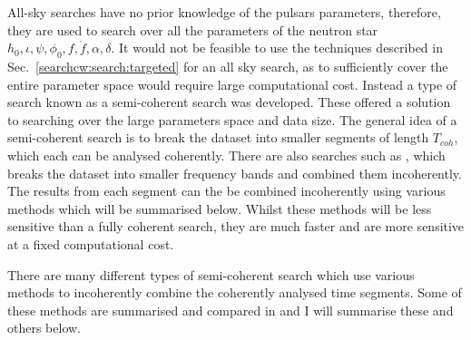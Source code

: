 All-sky searches have no prior knowledge of the pulsars parameters, therefore,
they are used to search over all the parameters of the neutron star $h_0, \iota, \psi, \phi_0, f,
\dot{f}, \alpha, \delta$. It would not be feasible to use the techniques described in
Sec.~\ref{searchcw:search:targeted} for an all sky search, as to sufficiently
cover the entire parameter space would require large computational cost.  Instead a type of search known as a
semi-coherent search was developed.  These offered a solution to searching over
the large parameters space and data size.  The general idea of a semi-coherent
search is to break the dataset into smaller segments of length $T_{coh}$, which
each can be analysed coherently. There are also searches such as \citep{messenger2007FastSearch}, which breaks the dataset into smaller frequency bands and combined them incoherently. 
The results from each segment can the be combined incoherently using various methods which will be
summarised below.  
Whilst these methods will be less sensitive than a fully coherent search, they are much faster and are more sensitive at a fixed computational cost.

There are many different types of semi-coherent search which use various
methods to incoherently combine the coherently analysed time segments.  Some of these methods are  summarised and compared in
\citep{walsh2016ComparisonMethods} and I will summarise these and others below.



